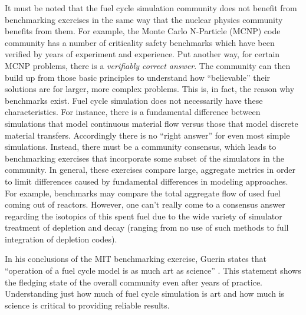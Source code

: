 It must be noted that the fuel cycle simulation community does not benefit from
benchmarking exercises in the same way that the nuclear physics community
benefits from them. For example, the Monte Carlo N-Particle (MCNP) code
community has a number of criticality safety benchmarks \cite{wagner_mcnp:_1992}
which have been verified by years of experiment and experience. Put another way,
for certain MCNP problems, there is a \textit{verifiably correct answer}. The
community can then build up from those basic principles to understand how
``believable'' their solutions are for larger, more complex problems. This is,
in fact, the reason why benchmarks exist. Fuel cycle simulation does not
necessarily have these characteristics. For instance, there is a fundamental
difference between simulations that model continuous material flow versus those
that model discrete material transfers. Accordingly there is no ``right
answer'' for even most simple simulations. Instead, there must be a community
consensus, which leads to benchmarking exercises that incorporate some subset of
the simulators in the community. In general, these exercises compare large,
aggregate metrics in order to limit differences caused by fundamental
differences in modeling approaches. For example, benchmarks may compare the
total aggregate flow of used fuel coming out of reactors. However, one can't
really come to a consensus answer regarding the isotopics of this spent fuel due
to the wide variety of simulator treatment of depletion and decay (ranging from
no use of such methods to full integration of depletion codes).

In his conclusions of the MIT benchmarking exercise, Guerin states that
``operation of a fuel cycle model is as much art as science''
\cite{guerin_benchmark_2009}. This statement shows the fledging state of the
overall community even after years of practice. Understanding just how much of
fuel cycle simulation is art and how much is science is critical to providing
reliable results.
